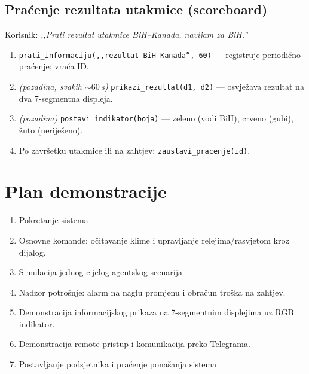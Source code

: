 \documentclass[11pt,a4paper]{article}
\begin{document}
\subsection{Praćenje rezultata utakmice (scoreboard)}
Korisnik: \emph{,,Prati rezultat utakmice BiH--Kanada, navijam za BiH.''}
\begin{enumerate}[nosep]
      \item \texttt{prati\_informaciju(,,rezultat BiH Kanada'', 60)} --- registruje
            periodično praćenje; vraća ID.
      \item \emph{(pozadina, svakih ${\sim}60$\,s)} \texttt{prikazi\_rezultat(d1, d2)} ---
            osvježava rezultat na dva 7-segmentna displeja.
      \item \emph{(pozadina)} \texttt{postavi\_indikator(boja)} --- zeleno (vodi BiH),
            crveno (gubi), žuto (neriješeno).
      \item Po završetku utakmice ili na zahtjev: \texttt{zaustavi\_pracenje(id)}.
\end{enumerate}

\section{Plan demonstracije}

\begin{enumerate}[nosep]
      \item Pokretanje sistema
      \item Osnovne komande: očitavanje klime i upravljanje relejima/rasvjetom kroz dijalog.
      \item Simulacija jednog cijelog agentskog scenarija
      \item Nadzor potrošnje: alarm na naglu promjenu i obračun troška na zahtjev.
      \item Demonstracija informacijskog prikaza na 7-segmentnim displejima uz RGB indikator.
      \item Demonstracija remote pristup i komunikacija preko Telegrama.
      \item Postavljanje podsjetnika i praćenje ponašanja sistema
\end{enumerate}

\end{document}
